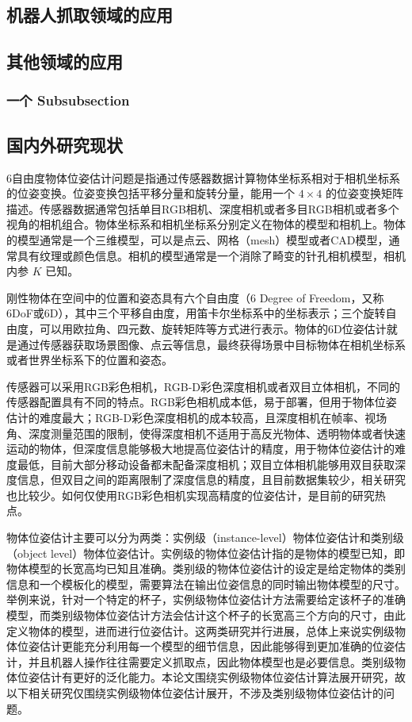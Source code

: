 \subsection{机器人抓取领域的应用}
\subsection{其他领域的应用}
\subsubsection{一个 Subsubsection}


\subsection{国内外研究现状}
\par 6自由度物体位姿估计问题是指通过传感器数据计算物体坐标系相对于相机坐标系的位姿变换。位姿变换包括平移分量和旋转分量，能用一个 $4\times 4$ 的位姿变换矩阵描述。传感器数据通常包括单目RGB相机、深度相机或者多目RGB相机或者多个视角的相机组合。物体坐标系和相机坐标系分别定义在物体的模型和相机上。物体的模型通常是一个三维模型，可以是点云、网格（mesh）模型或者CAD模型，通常具有纹理或颜色信息。相机的模型通常是一个消除了畸变的针孔相机模型，相机内参 $K$ 已知。
\par 刚性物体在空间中的位置和姿态具有六个自由度（6 Degree of Freedom，又称6DoF或6D），其中三个平移自由度，用笛卡尔坐标系中的坐标表示；三个旋转自由度，可以用欧拉角、四元数、旋转矩阵等方式进行表示。物体的6D位姿估计就是通过传感器获取场景图像、点云等信息，最终获得场景中目标物体在相机坐标系或者世界坐标系下的位置和姿态。
\par 传感器可以采用RGB彩色相机，RGB-D彩色深度相机或者双目立体相机，不同的传感器配置具有不同的特点。RGB彩色相机成本低，易于部署，但用于物体位姿估计的难度最大；RGB-D彩色深度相机的成本较高，且深度相机在帧率、视场角、深度测量范围的限制，使得深度相机不适用于高反光物体、透明物体或者快速运动的物体，但深度信息能够极大地提高位姿估计的精度，用于物体位姿估计的难度最低，目前大部分移动设备都未配备深度相机；双目立体相机能够用双目获取深度信息，但双目之间的距离限制了深度信息的精度，且目前数据集较少，相关研究也比较少。如何仅使用RGB彩色相机实现高精度的位姿估计，是目前的研究热点。

\par 物体位姿估计主要可以分为两类：实例级（instance-level）物体位姿估计和类别级（object level）物体位姿估计。实例级的物体位姿估计指的是物体的模型已知，即物体模型的长宽高均已知且准确。类别级的物体位姿估计的设定是给定物体的类别信息和一个模板化的模型，需要算法在输出位姿信息的同时输出物体模型的尺寸。举例来说，针对一个特定的杯子，实例级物体位姿估计方法需要给定该杯子的准确模型，而类别级物体位姿估计方法会估计这个杯子的长宽高三个方向的尺寸，由此定义物体的模型，进而进行位姿估计。这两类研究并行进展，总体上来说实例级物体位姿估计更能充分利用每一个模型的细节信息，因此能够得到更加准确的位姿估计，并且机器人操作往往需要定义抓取点，因此物体模型也是必要信息。类别级物体位姿估计有更好的泛化能力。本论文围绕实例级物体位姿估计算法展开研究，故以下相关研究仅围绕实例级物体位姿估计展开，不涉及类别级物体位姿估计的问题。
